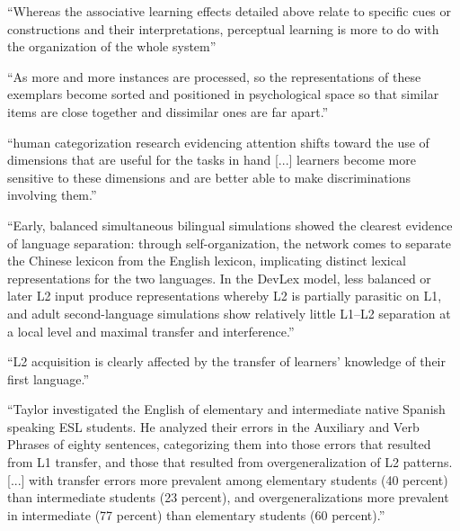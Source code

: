 ``Whereas the associative learning effects detailed above relate to specific cues
or constructions and their interpretations, perceptual learning is more to do
with the organization of the whole system''

``As more and more instances are processed,
so the representations of these exemplars become sorted and positioned in
psychological space so that similar items are close together and dissimilar
ones are far apart.''

``human categorization
research evidencing attention shifts toward the use of dimensions that are
useful for the tasks in hand [...] learners
become more sensitive to these dimensions and are better able to make
discriminations involving them.''

``Early, balanced simultaneous bilingual
simulations showed the clearest evidence of language separation: through
self-organization, the network comes to separate the Chinese lexicon from
the English lexicon, implicating distinct lexical representations for the
two languages. In the DevLex model, less balanced or later L2 input
produce representations whereby L2 is partially parasitic on L1, and adult
second-language simulations show relatively little L1–L2 separation at a local
level and maximal transfer and interference.''

``L2 acquisition is clearly affected by the transfer
of learners’ knowledge of their first language.''

``Taylor investigated
the English of elementary and intermediate native Spanish speaking ESL
students. He analyzed their errors in the Auxiliary and Verb Phrases of eighty
sentences, categorizing them into those errors that resulted from L1 transfer,
and those that resulted from overgeneralization of L2 patterns.
[...] with transfer
errors more prevalent among elementary students (40 percent) than
intermediate students (23 percent), and overgeneralizations more prevalent
in intermediate (77 percent) than elementary students (60 percent).''
